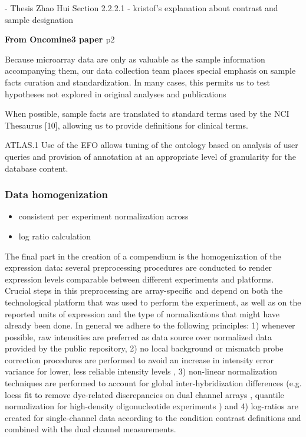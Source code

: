 - Thesis Zhao Hui Section 2.2.2.1
- kristof's explanation about contrast and sample designation


\textbf{From Oncomine3 paper \cite{Rhodes2007}} p2

Because microarray data are only as valuable as the sample information
accompanying them, our data collection team places special
emphasis on sample facts curation and standardization. In
many cases, this permits us to test hypotheses not explored
in original analyses and publications 

When possible, sample facts are translated to standard terms used
by the NCI Thesaurus [10], allowing us to provide definitions
for clinical terms.




\cite{Parkinson2009} ATLAS.1
Use of the EFO allows
tuning of the ontology based on analysis of user queries
and provision of annotation at an appropriate level of
granularity for the database content. 




\subsubsection{Data homogenization}

\begin{itemize}
\item consistent per experiment normalization across
\item log ratio calculation
\end{itemize}

The final part in the creation of a compendium is the homogenization of the 
expression data: several preprocessing procedures are conducted to render 
expression levels comparable between different experiments and platforms. 
%
Crucial steps in this preprocessing are array-specific and depend on both the 
technological platform that was used to perform the experiment, as well as on 
the reported units of expression and the type of normalizations that might have 
already been done. 
%
In general we adhere to the following principles: 
%
1) whenever possible, raw intensities are preferred as data source over 
normalized data provided by the public repository, 
%
2) no local background or mismatch probe correction procedures are performed to 
avoid an increase in intensity error variance for lower, less reliable 
intensity levels \cite{Ritchie2007,Engelen2006,Li2001}, 
%
3) non-linear normalization techniques are performed to account for global 
inter-hybridization differences (e.g. loess fit to remove dye-related 
discrepancies on dual channel arrays \cite{Yang2002}, quantile normalization 
for high-density oligonucleotide experiments \cite{Bolstad2003}) and 
%
4) log-ratios are created for single-channel data according to the condition 
contrast definitions and combined with the dual channel measurements.




